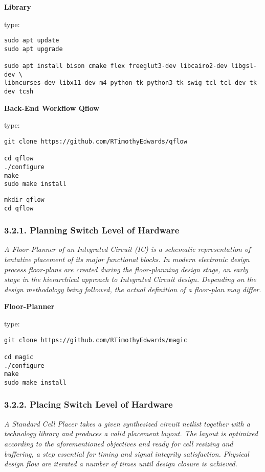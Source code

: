 \documentclass[]{article}
\begin{document}
\textbf{Library}

type:

\begin{verbatim}
sudo apt update
sudo apt upgrade

sudo apt install bison cmake flex freeglut3-dev libcairo2-dev libgsl-dev \
libncurses-dev libx11-dev m4 python-tk python3-tk swig tcl tcl-dev tk-dev tcsh
\end{verbatim}

\textbf{Back-End Workflow Qflow}

type:

\begin{verbatim}
git clone https://github.com/RTimothyEdwards/qflow

cd qflow
./configure
make
sudo make install
\end{verbatim}

\begin{verbatim}
mkdir qflow
cd qflow
\end{verbatim}

\subsubsection{3.2.1. Planning Switch Level of
Hardware}\label{planning-switch-level-of-hardware}

\emph{A Floor-Planner of an Integrated Circuit (IC) is a schematic
representation of tentative placement of its major functional blocks. In
modern electronic design process floor-plans are created during the
floor-planning design stage, an early stage in the hierarchical approach
to Integrated Circuit design. Depending on the design methodology being
followed, the actual definition of a floor-plan may differ.}

\textbf{Floor-Planner}

type:

\begin{verbatim}
git clone https://github.com/RTimothyEdwards/magic

cd magic
./configure
make
sudo make install
\end{verbatim}

\subsubsection{3.2.2. Placing Switch Level of
Hardware}\label{placing-switch-level-of-hardware}

\emph{A Standard Cell Placer takes a given synthesized circuit netlist
together with a technology library and produces a valid placement
layout. The layout is optimized according to the aforementioned
objectives and ready for cell resizing and buffering, a step essential
for timing and signal integrity satisfaction. Physical design flow are
iterated a number of times until design closure is achieved.}
\end{document}
